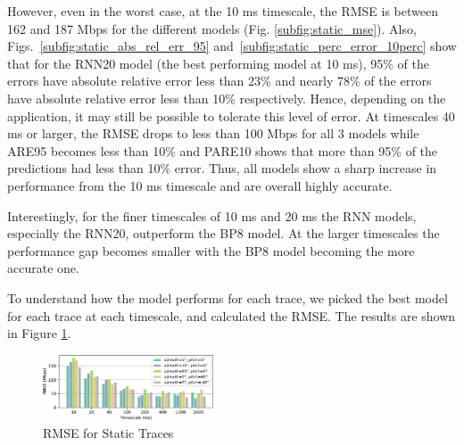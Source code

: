 \documentclass[sigconf,anonymous]{acmart}
\begin{document}
However, even in the worst case, at the 10 ms timescale, the RMSE is between 162 and 187 Mbps for the different models (Fig. \ref{subfig:static_mse}). Also, Figs.~\ref{subfig:static_abs_rel_err_95} and~\ref{subfig:static_perc_error_10perc} show that for the RNN20 model (the best performing model at 10 ms), 95\% of the errors have absolute relative error less than 23\% and nearly 78\% of the errors have absolute relative error less than 10\% respectively. Hence, depending on the application, it may still be possible to tolerate this level of error. At timescales 40 ms or larger, the RMSE drops to less than 100 Mbps for all 3 models while ARE95 becomes less than 10\% and PARE10 shows that more than 95\% of the predictions had less than 10\% error. Thus, all models show a sharp increase in performance from the 10 ms timescale and are overall highly accurate.

Interestingly, for the finer timescales of 10 ms and 20 ms the RNN models, especially the RNN20, outperform the BP8 model. At the larger timescales the performance gap becomes smaller with the BP8 model becoming the more accurate one.



To understand how the model performs for each trace, we picked the best model for each trace at each timescale, and calculated the RMSE. The results are shown in Figure \ref{figure: RMSE for Static Traces}.

\begin{figure}[h]
\includegraphics[width=0.45\textwidth]{figs/rmse_along_angle.pdf}
\caption{RMSE for Static Traces}
\label{figure: RMSE for Static Traces}
\end{figure}
\end{document}
